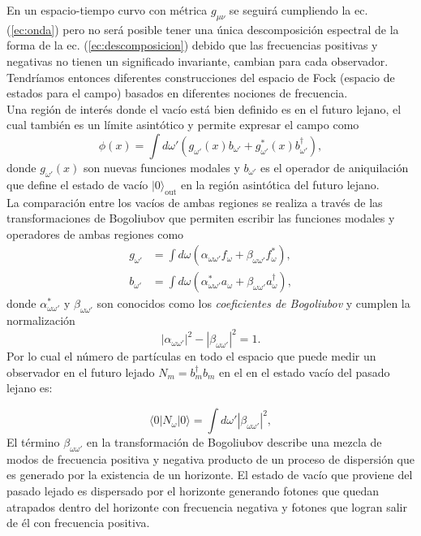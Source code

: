 En un espacio-tiempo curvo con m\'{e}trica $g_{\mu \nu}$ se seguir\'{a} cumpliendo la ec. (\ref{ec:onda}) pero no ser\'{a} posible tener una \'{u}nica descomposici\'{o}n espectral de la forma de la ec. (\ref{ec:descomposicion}) debido que las frecuencias positivas y negativas no tienen un significado invariante, cambian para cada observador. Tendr\'{i}amos entonces diferentes construcciones del espacio de Fock (espacio de estados para el campo) basados en diferentes nociones de frecuencia.\\

Una regi\'{o}n de inter\'{e}s donde el vac\'{i}o est\'{a} bien definido es en el futuro lejano, el cual tambi\'{e}n es un l\'{i}mite asint\'{o}tico y permite expresar el campo como
\begin{equation}
\phi(x)=\int d\omega'\left( g_{\omega'}(x)b_{\omega'}+g_{\omega'}^*(x)b_{\omega'}^{\dagger}\right),
\end{equation}
donde $g_{\omega'}(x)$ son nuevas funciones modales y $b_{\omega'}$ es el operador de aniquilaci\'{o}n que define el estado de vac\'{i}o $|0\rangle_{\text{out}}$ en la regi\'{o}n asint\'{o}tica del futuro lejano.\\

La comparaci\'{o}n entre los vac\'{i}os de ambas regiones se realiza a través de las transformaciones de Bogoliubov que permiten escribir las funciones modales y operadores de ambas regiones como
\begin{align}
g_{\omega'}&=\int d\omega\left(\alpha_{\omega \omega'}f_{\omega}+\beta_{\omega \omega'}f^*_{\omega}\right),\\
b_{\omega'}&=\int d\omega\left(\alpha^*_{\omega \omega'}a_{\omega}+\beta_{\omega \omega'}a_{\omega}^{\dagger}\right),
\end{align}
donde $\alpha^*_{\omega \omega'}$ y $\beta_{\omega \omega'}$ son conocidos como los \textit{coeficientes de Bogoliubov} y cumplen la normalizaci\'{o}n
\begin{equation}
 |\alpha_{\omega \omega'}|^2-|\beta_{\omega \omega'}|^2=1.
 \end{equation}
Por lo cual el n\'{u}mero de part\'{i}culas en todo el espacio que puede medir un observador en el futuro lejado $N_m=b_m^{\dagger}b_m$ en el en el estado vac\'{i}o del pasado lejano es:

\begin{equation}
\langle 0|N_{\omega}|0\rangle=\int d\omega'|\beta_{\omega \omega'}|^2,
\end{equation}
El t\'{e}rmino $\beta_{\omega \omega'}$ en la transformaci\'{o}n de Bogoliubov describe una mezcla de modos de frecuencia positiva y negativa producto de un proceso de dispersi\'{o}n que es generado por la existencia de un horizonte. El estado de vac\'{i}o que proviene del pasado lejado es dispersado por el horizonte generando fotones que quedan atrapados dentro del horizonte con frecuencia negativa y fotones que logran salir de \'{e}l con frecuencia positiva.\\

